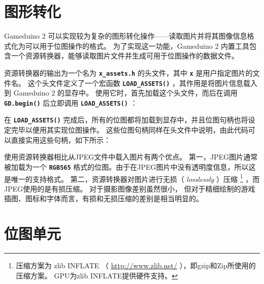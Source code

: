\documentclass[10pt]{book}
\newcommand{\gdtwo}{Gameduino 2 }
\newcommand{\mach}[1]{\texttt{\textbf{#1}}}
\begin{document}
\begin{CJK}{UTF8}{gkai}
\newpage
\section{图形转化}
\label{assets}

\gdtwo 可以实现较为复杂的图形转化操作——读取图片并将其图像信息格式化为可以用于位图操作的格式。
为了实现这一功能，\gdtwo 内置工具包含一个资源转换器，能够读取图片文件并生成可用于位图操作的数据文件。


资源转换器的输出为一个名为 \mach{x\_assets.h} 的头文件，其中 \mach{x} 是用户指定图片的文件名。
这个头文件定义了一个宏函数 \mach{LOAD\_ASSETS()} ，其作用是将图片信息载入到 \gdtwo 的显存中。
使用它时，首先加载这个头文件，而后在调用 \mach{GD.begin()} 后立即调用 \mach{LOAD\_ASSETS()} ：


在 \mach{LOAD\_ASSETS()} 完成后，所有的位图都将加载到显存中，并且位图句柄也将设定完毕以便用其实现位图操作。
这些位图句柄同样在头文件中说明，由此代码可以直接实用这些句柄，如下所示：


使用资源转换器相比从JPEG文件中载入图片有两个优点。
第一，JPEG图片通常被加载为一个 \mach{RGB565} 格式的位图。由于在JPEG图片中没有透明度信息，所以这是唯一的支持格式。
第二，资源转换器对图片进行无损（ \textit{losslessly} ）压缩 \footnote{
压缩方案为 zlib INFLATE
（ \url{http://www.zlib.net/} ），即gzip和Zip所使用的压缩方案。
GPU为zlib INFLATE提供硬件支持。} ，而JPEG使用的是有损压缩。
对于摄影图像差别虽然很小，
但对于精细绘制的游戏插图、图标和字体而言，有损和无损压缩的差别是相当明显的。

\newpage
\section{位图单元}


\end{CJK}
\end{document}
